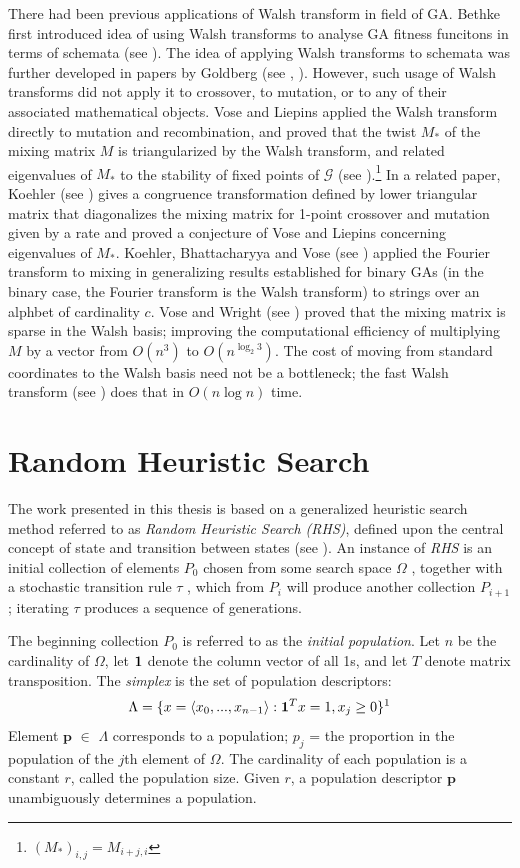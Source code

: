 There had been previous applications of Walsh transform in field of GA. Bethke first introduced 
idea of using Walsh transforms to analyse GA fitness funcitons in terms of schemata (see \cite{Bethke1981}). 
The idea of applying Walsh transforms to schemata was further developed in papers by Goldberg (see \cite{Goldberg1989a}, \cite{Goldberg1989b}). 
However, such usage of Walsh transforms did not apply it to crossover, to mutation, or to any of their 
associated mathematical objects. Vose and Liepins applied the Walsh transform directly to mutation and recombination, and proved that the 
twist $M_*$ of the mixing matrix $M$ is triangularized by the Walsh transform, and 
related eigenvalues of $M_*$ to the stability of fixed points of $\mathcal{G}$ (see \cite{VoseLiepins1991}).\footnote{$(M_*)_{i,j} = M_{i+j, i}$} 
In a related paper, Koehler (see \cite{Koehler1994}) gives a congruence 
transformation defined by lower triangular matrix that diagonalizes the mixing matrix for 1-point crossover and mutation 
given by a rate and proved a conjecture of Vose and Liepins concerning eigenvalues of $M_*$. Koehler, Bhattacharyya 
and Vose (see \cite{KoehlerBhatta1997}) applied the Fourier transform to mixing in generalizing results established 
for binary GAs (in the binary case, the Fourier transform is the Walsh transform) to 
strings over an alphbet of cardinality $c$. Vose and Wright (see \cite{VoseWright1998}) proved that 
the mixing matrix is sparse in the Walsh basis; improving the computational efficiency of multiplying $M$ by a vector from 
$O(n^3)$ to $O(n^{{\log}_2 3})$. The cost of moving from standard coordinates to the Walsh basis need not be a bottleneck; 
the fast Walsh transform (see \cite{Shanks1969}) does that in $O(n \log n)$ time.

\section{Random Heuristic Search}
The work presented in this thesis is based on a generalized heuristic search method referred 
to as {\em Random Heuristic Search (RHS)}, defined upon the central concept of state and transition 
between states (see \cite{Vose1999}). An instance of {\em RHS} is an initial collection of elements $P_0$ chosen 
from some search space $\Omega$ , together with a stochastic transition rule $\tau$ , which from $P_i$ will 
produce another collection $P_{i+1}$; iterating $\tau$ produces a sequence of generations.

The beginning collection $P_0$ is referred to as the {\em initial population}. Let $n$ be the cardinality 
of $\Omega$, let ${\bf1}$ denote the column vector of all 1s, and let $T$ denote matrix transposition. 
The {\em simplex} is the set of population descriptors:
\[
\Lambda = \{x = \langle x_0,...,x_{n-1} \rangle: {\bf1}^T x=1, x_j \geq 0 \} \text{\footnotemark\label{fnm:1}}
\]
Element $\bm{p}$ $\in$ $\Lambda$ corresponds to a population;
$p_j$ = the proportion in the population of the $j$th element of $\Omega$. 
The cardinality of each population is a constant $r$, called the population size. 
Given $r$, a population descriptor $\bm{p}$ unambiguously determines a population.

